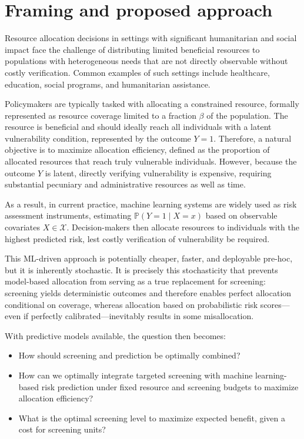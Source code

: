 \documentclass[11pt]{article}
\begin{document}
\section*{Framing and proposed approach}

Resource allocation decisions in settings with significant humanitarian and social impact face the challenge of distributing limited beneficial resources to populations with heterogeneous needs that are not directly observable without costly verification. Common examples of such settings include healthcare, education, social programs, and humanitarian assistance.

Policymakers are typically tasked with allocating a constrained resource, formally represented as resource coverage limited to a fraction $\beta$ of the population. The resource is beneficial and should ideally reach all individuals with a latent vulnerability condition, represented by the outcome $Y = 1$. Therefore, a natural objective is to maximize allocation efficiency, defined as the proportion of allocated resources that reach truly vulnerable individuals. However, because the outcome $Y$ is latent, directly verifying vulnerability is expensive, requiring substantial pecuniary and administrative resources as well as time.

As a result, in current practice, machine learning systems are widely used as risk assessment instruments, estimating $\mathbb{P}(Y = 1 \mid X = x)$ based on observable covariates $X \in \mathcal{X}$. Decision-makers then allocate resources to individuals with the highest predicted risk, lest costly verification of vulnerability be required.

This ML-driven approach is potentially cheaper, faster, and deployable pre-hoc, but it is inherently stochastic. It is precisely this stochasticity that prevents model-based allocation from serving as a true replacement for screening: screening yields deterministic outcomes and therefore enables perfect allocation conditional on coverage, whereas allocation based on probabilistic risk scores—even if perfectly calibrated—inevitably results in some misallocation.

With predictive models available, the question then becomes: 
\begin{itemize}
    \item How should screening and prediction be optimally combined? 
    \item How can we optimally integrate targeted screening with machine learning-based risk prediction under fixed resource and screening budgets to maximize allocation efficiency?
    \item What is the optimal screening level to maximize expected benefit, given a cost for screening units?
\end{itemize}
\end{document}
